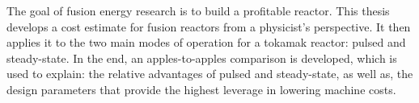 % 
% 
%
The goal of fusion energy research is to build a profitable reactor. This thesis develops a cost estimate for fusion reactors from a physicist's perspective. It then applies it to the two main modes of operation for a tokamak reactor: pulsed and steady-state. In the end, an apples-to-apples comparison is developed, which is used to explain: the relative advantages of pulsed and steady-state, as well as, the design parameters that provide the highest leverage in lowering machine costs.
